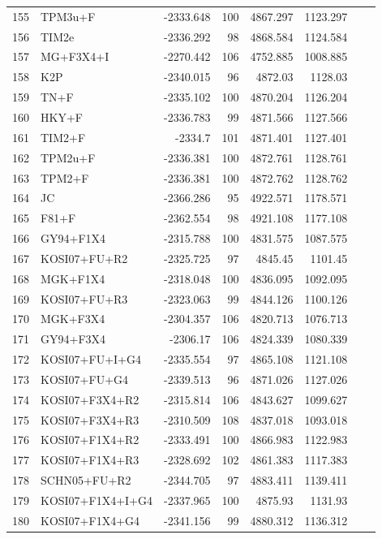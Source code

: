 \begin{longtable}{clrrrrrr}
	155 & TPM3u+F & -2333.648 & 100 & 4867.297 & 1123.297 \\ 
	156 & TIM2e & -2336.292 & 98 & 4868.584 & 1124.584 \\ 
	157 & MG+F3X4+I & -2270.442 & 106 & 4752.885 & 1008.885 \\ 
	158 & K2P & -2340.015 & 96 & 4872.03 & 1128.03 \\ 
	159 & TN+F & -2335.102 & 100 & 4870.204 & 1126.204 \\ 
	160 & HKY+F & -2336.783 & 99 & 4871.566 & 1127.566 \\ 
	161 & TIM2+F & -2334.7 & 101 & 4871.401 & 1127.401 \\ 
	162 & TPM2u+F & -2336.381 & 100 & 4872.761 & 1128.761 \\ 
	163 & TPM2+F & -2336.381 & 100 & 4872.762 & 1128.762 \\ 
	164 & JC & -2366.286 & 95 & 4922.571 & 1178.571 \\ 
	165 & F81+F & -2362.554 & 98 & 4921.108 & 1177.108 \\ 
	166 & GY94+F1X4 & -2315.788 & 100 & 4831.575 & 1087.575 \\ 
	167 & KOSI07+FU+R2 & -2325.725 & 97 & 4845.45 & 1101.45 \\ 
	168 & MGK+F1X4 & -2318.048 & 100 & 4836.095 & 1092.095 \\ 
	169 & KOSI07+FU+R3 & -2323.063 & 99 & 4844.126 & 1100.126 \\ 
	170 & MGK+F3X4 & -2304.357 & 106 & 4820.713 & 1076.713 \\ 
	171 & GY94+F3X4 & -2306.17 & 106 & 4824.339 & 1080.339 \\ 
	172 & KOSI07+FU+I+G4 & -2335.554 & 97 & 4865.108 & 1121.108 \\ 
	173 & KOSI07+FU+G4 & -2339.513 & 96 & 4871.026 & 1127.026 \\ 
	174 & KOSI07+F3X4+R2 & -2315.814 & 106 & 4843.627 & 1099.627 \\ 
	175 & KOSI07+F3X4+R3 & -2310.509 & 108 & 4837.018 & 1093.018 \\ 
	176 & KOSI07+F1X4+R2 & -2333.491 & 100 & 4866.983 & 1122.983 \\ 
	177 & KOSI07+F1X4+R3 & -2328.692 & 102 & 4861.383 & 1117.383 \\ 
	178 & SCHN05+FU+R2 & -2344.705 & 97 & 4883.411 & 1139.411 \\ 
	179 & KOSI07+F1X4+I+G4 & -2337.965 & 100 & 4875.93 & 1131.93 \\ 
	180 & KOSI07+F1X4+G4 & -2341.156 & 99 & 4880.312 & 1136.312 \\ 

\end{longtable}
